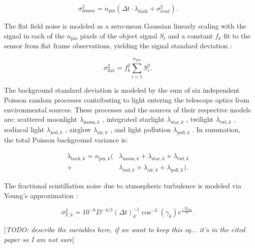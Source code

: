 \documentclass[a4paper,twocolumn]{spaceDebrisC} %
\begin{document}
\begin{equation} \label{eq:sensor_noise}
  \sigma_\text{sensor}^2 = n_\text{pix} \left( \Delta t \cdot \lambda_\text{dark} + \sigma_\text{read}^2 \right).
\end{equation}

The flat field noise is modeled as a zero-mean Gaussian linearly scaling with the signal in each of the $n_\text{pix}$ pixels of the object signal $S_i$ and a constant $f_k$ fit to the sensor from flat frame observations, yielding the signal standard deviation \cite{newberry1996}: 

\begin{equation}
  \sigma_\text{flat}^2 = f_k^2 \sum_{i=1}^{n_\text{pix}} S_i^2.
\end{equation}

The background standard deviation is modeled by the sum of six independent Poisson random processes contributing to light entering the telescope optics from environmental sources. These processes and the sources of their respective models are: scattered moonlight $\lambda_{\text{moon},k}$ \cite{daniels1977}, integrated starlight $\lambda_{\text{star},k}$ \cite{krag2003}, twilight $\lambda_{\text{twi},k}$ \cite{patat2006}, zodiacal light $\lambda_{\text{zod},k}$ \cite{roach1972}, airglow $\lambda_{\text{air},k}$ \cite{krag2003}, and light pollution $\lambda_{\text{poll},k}$ \cite{falchi2016, falchi2016_data}. In summation, the total Poisson background variance is:

\begin{equation}
  \begin{split}
  \lambda_{\text{back},k} = n_{\text{pix},k} ( &\lambda_{\text{moon},k} + \lambda_{\text{star},k} + \lambda_{\text{twi},k} \\+ &\lambda_{\text{zod},k} + \lambda_{\text{air},k} + \lambda_{\text{poll},k} ).
  \end{split}
\end{equation}

The fractional scintillation noise due to atmospheric turbulence is modeled via Young's approximation \cite{osborn2015}:

\begin{equation} \label{eq:scint_noise}
  \sigma^2_{Y,k} = 10^{-6} D^{-4/3} (\Delta t)_k^{-1} \cos^{-3}\left(\gamma_k\right) e^{\frac{-2h_\text{obs}}{H}}.
\end{equation}

[\textit{TODO: describe the variables here, if we want to keep this eq... it's in the cited paper so I am not sure}]
\end{document}
